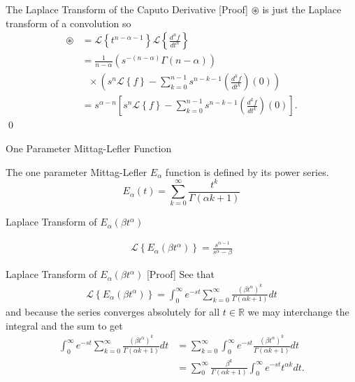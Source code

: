 \documentclass[pdf]{beamer}
\newcommand{\laplace}[1]{ \mathcal{L} \left\{ #1 \right\} }
\newcommand{\der}[3]{ \frac{d^{#3}#1}{d#2^{#3}} }
\begin{document}
\begin{frame}{The Laplace Transform of the Caputo Derivative [Proof]}
	$ \circledast $ is just the Laplace transform of a convolution so 
	\begin{align*}
		\circledast &= \laplace{t^{n-\alpha-1}} \laplace{\der{f}{t}{n}} \\
		&= \frac{1}{n-\alpha} \left( s^{-(n-\alpha)} \Gamma(n-\alpha) \right) \\
		& \ \ \ \times \left( s^n \laplace{f} - \sum_{k=0}^{n-1} s^{n-k-1} \left( \der{f}{t}{k} \right)(0) \right) \\
		&= s^{\alpha - n} \left[ s^n \laplace{f} - \sum_{k=0}^{n-1} s^{n-k-1} \left( \der{f}{t}{k} \right)(0) \right].
	\end{align*}
	\qed
\end{frame}

\begin{frame}{One Parameter Mittag-Lefler Function}
	\begin{definition}
		The one parameter Mittag-Lefler $ E_\alpha $ function is defined by its power series.
		$$
			E_\alpha(t) = \sum_{k=0}^{\infty} \frac{t^k}{\Gamma(\alpha k + 1)}
		$$
	\end{definition}
\end{frame}

\begin{frame}{Laplace Transform of $E_\alpha(\beta t^\alpha)$}
	\begin{lemma}
		\begin{align*}	
			\laplace{ E_\alpha (\beta t^\alpha)} = \frac{s^{\alpha - 1}}{s^\alpha - \beta}
		\end{align*}
	\end{lemma}
\end{frame}

\begin{frame}{Laplace Transform of $E_\alpha(\beta t^\alpha)$ [Proof]}
See that
	\begin{align*}
		\laplace{ E_\alpha (\beta t^\alpha)} = \int_0^\infty e^{-st} \sum_{k=0}^\infty \frac{(\beta t^\alpha)^k}{\Gamma(\alpha k+1)} dt
	\end{align*}
	and because the series converges absolutely for all $ t \in \mathbb{R} $  we may interchange the integral
	and the sum to get
	\begin{align*}
		\int_0^\infty e^{-st} \sum_{k=0}^\infty \frac{(\beta t^\alpha)^k}{\Gamma(\alpha k+1)} dt &= \sum_{k=0}^\infty \int_0^\infty e^{-st} \frac{(\beta t^\alpha)^k}{\Gamma(\alpha k + 1)} dt \\
			&= \sum_0^\infty \frac{\beta^k}{\Gamma(\alpha k + 1)} \int_0^\infty e^{-st} t^{\alpha k} dt. \\
	\end{align*}
\end{frame}
\end{document}
